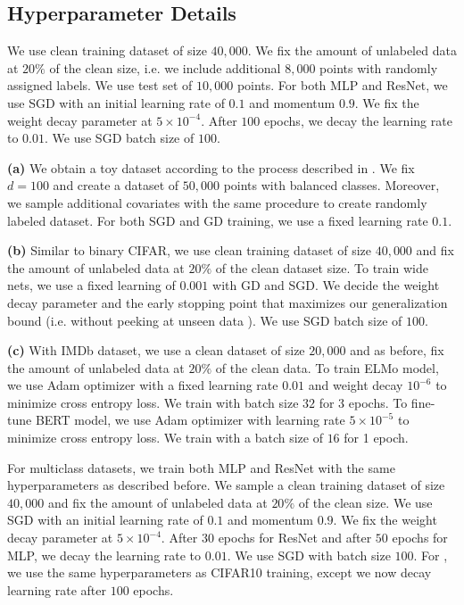 

\subsection{Hyperparameter Details}


\textbf{ {} {}} We use clean training dataset of size $40,000$. We fix the amount of unlabeled data at $20\%$ of the clean size, i.e. we include additional $8,000$ points with randomly assigned labels. We use test set of $10,000$ points. For both MLP and ResNet, we use SGD with an initial learning rate of $0.1$ and momentum $0.9$. We fix the weight decay parameter at $5\times 10^{-4}$. After $100$ epochs, we decay the learning rate to $0.01$. We use SGD batch size of $100$. 

\textbf{ (a) {} {}} We obtain a toy dataset according to the process described in . We fix $d=100$ and create a dataset of $50,000$ points with balanced classes. Moreover, we sample additional covariates with the same procedure to create randomly labeled dataset. For both SGD and GD training, we use a fixed learning rate $0.1$.    

\textbf{ (b) {} {}} Similar to binary CIFAR, we use clean training dataset of size $40,000$ and fix the amount of unlabeled data at $20\%$ of the clean dataset size. To train wide nets, we use a fixed learning of $0.001$ with GD and SGD. We decide the weight decay parameter and the early stopping point that maximizes our generalization bound (i.e. without peeking at unseen data ).  We use SGD batch size of $100$. 

\textbf{ (c) {} {}} With IMDb dataset, we use a clean dataset of size $20,000$ and as before, fix the amount of unlabeled data at $20\%$ of the clean data. To train ELMo model, we use Adam optimizer with a fixed learning rate $0.01$ and weight decay $10^{-6}$ to minimize cross entropy loss. We train with batch size $32$ for 3 epochs. To fine-tune BERT model, we use Adam optimizer with learning rate $5\times 10^{-5}$ to minimize cross entropy loss. We train with a batch size of $16$ for 1 epoch.    

\textbf{ {} {}} For multiclass datasets, we train both MLP and ResNet with the same hyperparameters as described before. We sample a clean training dataset of size $40,000$ and fix the amount of unlabeled data at $20\%$ of the clean size. We use SGD with an initial learning rate of $0.1$ and momentum $0.9$. We fix the weight decay parameter at $5\times 10^{-4}$. After $30$ epochs for ResNet and after $50$ epochs for MLP, we decay the learning rate to $0.01$.  We use SGD with batch size $100$. 
For , we use the same hyperparameters as 
CIFAR10 training, except we now decay learning rate after $100$ epochs. 


